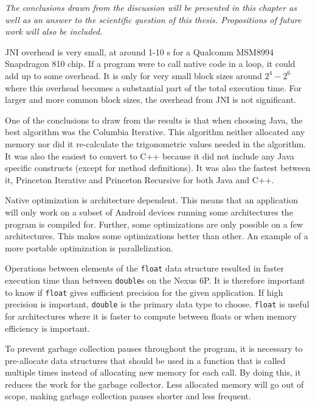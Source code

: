 \textit{The conclusions drawn from the discussion will be presented in this chapter as well as an answer to the scientific question of this thesis. Propositions of future work will also be included.}

JNI overhead is very small, at around 1-10 \textmu s for a Qualcomm MSM8994 Snapdragon 810 chip. If a program were to call native code in a loop, it could add up to some overhead. It is only for very small block sizes around $2^4 - 2^6$ where this overhead becomes a substantial part of the total execution time. For larger and more common block sizes, the overhead from JNI is not significant.

One of the conclusions to draw from the results is that when choosing Java, the best algorithm was the Columbia Iterative. This algorithm neither allocated any memory nor did it re-calculate the trigonometric values needed in the algorithm. It was also the easiest to convert to C++ because it did not include any Java specific constructs (except for method definitions). It was also the fastest between it, Princeton Iterative and Princeton Recursive for both Java and C++.

Native optimization is architecture dependent. This means that an application will only work on a subset of Android devices running some architectures the program is compiled for. Further, some optimizations are only possible on a few architectures. This makes some optimizations better than other. An example of a more portable optimization is parallelization.

Operations between elements of the \texttt{float} data structure resulted in faster execution time than between \texttt{double}s on the Nexus 6P. It is therefore important to know if \texttt{float} gives sufficient precision for the given application. If high precision is important, \texttt{double} is the primary data type to choose. \texttt{float} is useful for architectures where it is faster to compute between floats or when memory efficiency is important.

To prevent garbage collection pauses throughout the program, it is necessary to pre-allocate data structures that should be used in a function that is called multiple times instead of allocating new memory for each call. By doing this, it reduces the work for the garbage collector. Less allocated memory will go out of scope, making garbage collection pauses shorter and less frequent.

